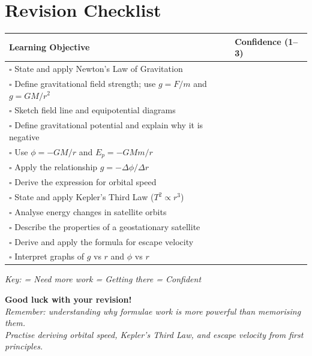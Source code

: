 \newpage
\section{Revision Checklist}

\begin{checklistbox}
\small
\renewcommand{\arraystretch}{1.5}
\begin{tabular}{p{11cm} >{\centering\arraybackslash}p{2.5cm}}
\toprule
\textbf{Learning Objective} & \textbf{Confidence (1--3)} \\
\midrule
$\square$\; State and apply Newton's Law of Gravitation & \\
$\square$\; Define gravitational field strength; use $g = F/m$ and $g = GM/r^2$ & \\
$\square$\; Sketch field line and equipotential diagrams & \\
$\square$\; Define gravitational potential and explain why it is negative & \\
$\square$\; Use $\phi = -GM/r$ and $E_p = -GMm/r$ & \\
$\square$\; Apply the relationship $g = -\Delta\phi/\Delta r$ & \\
$\square$\; Derive the expression for orbital speed & \\
$\square$\; State and apply Kepler's Third Law ($T^2 \propto r^3$) & \\
$\square$\; Analyse energy changes in satellite orbits & \\
$\square$\; Describe the properties of a geostationary satellite & \\
$\square$\; Derive and apply the formula for escape velocity & \\
$\square$\; Interpret graphs of $g$ vs $r$ and $\phi$ vs $r$ & \\
\bottomrule
\end{tabular}

\medskip
\begin{center}
\textit{Key: = Need more work  = Getting there  = Confident}
\end{center}
\end{checklistbox}

\vspace{1cm}
\begin{center}
{\large\bfseries\color{cieprimary} Good luck with your revision!}\\[0.4cm]
\textit{Remember: understanding \emph{why} formulae work is more powerful than
memorising them.}\\[0.2cm]
\textit{Practise deriving orbital speed, Kepler's Third Law, and escape velocity
from first principles.}
\end{center}
